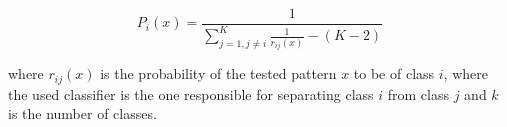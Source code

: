 \documentclass[conference]{IEEEtran}
\begin{document}
%
\[
P_i(x)  = \frac{1}{{\sum\limits_{j = 1,j \ne i}^K {\frac{1}{{r_{ij}(x) }} - (K - 2)} }}
\]

where $r_{ij}(x)$   is the probability of the tested pattern $x$ to be of class $i$, where the used classifier is the one responsible for separating class $i$ from class $j$  and $k$ is the number of classes.
\end{document}
